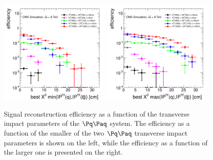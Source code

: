\begin{figure}[htbp]
\includegraphics[width=0.49\textwidth]{plots/signal/effIP2dMin.pdf}
\includegraphics[width=0.49\textwidth]{plots/signal/effIP2dMax.pdf}
\caption{Signal reconstruction efficiency as a function of the transverse impact
parameters of the $\qq$ system. The efficiency as a function of the smaller 
of the two $\qq$ transverse impact parameters
is shown on the left, while the efficiency as a function of the larger one 
is presented on the right.
\label{fig:effIP2d}}
\end{figure}

